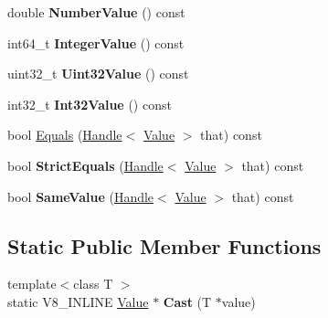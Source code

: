 \begin{DoxyCompactItemize}
\item 
\hypertarget{classv8_1_1Value_a4634d525bae654cdc50c398bfaee11aa}{double {\bfseries Number\-Value} () const }\label{classv8_1_1Value_a4634d525bae654cdc50c398bfaee11aa}

\item 
\hypertarget{classv8_1_1Value_ac61c74a94dea10f48a64f5906b6dd43d}{int64\-\_\-t {\bfseries Integer\-Value} () const }\label{classv8_1_1Value_ac61c74a94dea10f48a64f5906b6dd43d}

\item 
\hypertarget{classv8_1_1Value_af25557359e6bb79436ed60df18703d66}{uint32\-\_\-t {\bfseries Uint32\-Value} () const }\label{classv8_1_1Value_af25557359e6bb79436ed60df18703d66}

\item 
\hypertarget{classv8_1_1Value_a24daae9d99d02ff2e24b60287dcd4d95}{int32\-\_\-t {\bfseries Int32\-Value} () const }\label{classv8_1_1Value_a24daae9d99d02ff2e24b60287dcd4d95}

\item 
bool \hyperlink{classv8_1_1Value_adc2a7a92a120675bbd4c992163a20869}{Equals} (\hyperlink{classv8_1_1Handle}{Handle}$<$ \hyperlink{classv8_1_1Value}{Value} $>$ that) const 
\item 
\hypertarget{classv8_1_1Value_abb564818715b818957adc97716a076ba}{bool {\bfseries Strict\-Equals} (\hyperlink{classv8_1_1Handle}{Handle}$<$ \hyperlink{classv8_1_1Value}{Value} $>$ that) const }\label{classv8_1_1Value_abb564818715b818957adc97716a076ba}

\item 
\hypertarget{classv8_1_1Value_a7e49ca617f5d1773a81bae18a8062084}{bool {\bfseries Same\-Value} (\hyperlink{classv8_1_1Handle}{Handle}$<$ \hyperlink{classv8_1_1Value}{Value} $>$ that) const }\label{classv8_1_1Value_a7e49ca617f5d1773a81bae18a8062084}

\end{DoxyCompactItemize}
\subsection*{Static Public Member Functions}
\begin{DoxyCompactItemize}
\item 
\hypertarget{classv8_1_1Value_a1e7d6c8a037ff22009be4996f88fab21}{{\footnotesize template$<$class T $>$ }\\static V8\-\_\-\-I\-N\-L\-I\-N\-E \hyperlink{classv8_1_1Value}{Value} $\ast$ {\bfseries Cast} (T $\ast$value)}\label{classv8_1_1Value_a1e7d6c8a037ff22009be4996f88fab21}

\end{DoxyCompactItemize}


